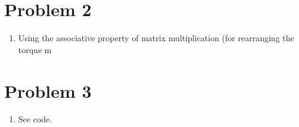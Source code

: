 \documentclass{article}
\begin{document}
\section*{Problem 2}
\begin{enumerate}[label=(\roman*)]
\item Using the associative property of matrix multiplication (for rearranging the torque m

\end{enumerate}


\section*{Problem 3}
\begin{enumerate}[label=(\roman*)]
\item See code.


\end{enumerate}
\end{document}

